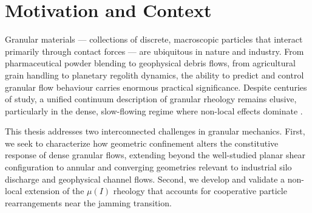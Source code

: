 \section{Motivation and Context}

Granular materials --- collections of discrete, macroscopic particles that interact primarily through contact forces --- are ubiquitous in nature and industry. From pharmaceutical powder blending to geophysical debris flows, from agricultural grain handling to planetary regolith dynamics, the ability to predict and control granular flow behaviour carries enormous practical significance. Despite centuries of study, a unified continuum description of granular rheology remains elusive, particularly in the dense, slow-flowing regime where non-local effects dominate \cite{miidi2004,daCruz2005,Jop2006}.

This thesis addresses two interconnected challenges in granular mechanics. First, we seek to characterize how geometric confinement alters the constitutive response of dense granular flows, extending beyond the well-studied planar shear configuration to annular and converging geometries relevant to industrial silo discharge and geophysical channel flows. Second, we develop and validate a non-local extension of the $\mu(I)$ rheology that accounts for cooperative particle rearrangements near the jamming transition.
